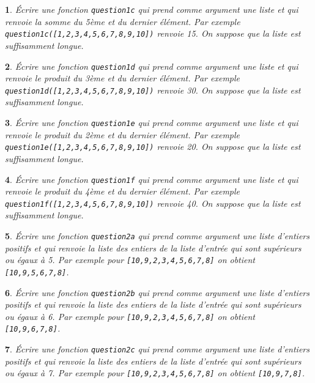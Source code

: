 \documentclass[10pt]{article}
\newtheorem{exi}{}
\newenvironment{exo}{\begin{exi}\em}{\end{exi}}
\begin{document}
\vspace*{-2ex}
\begin{exo}
    Écrire une fonction {\tt question1c} qui prend comme argument une liste et
qui renvoie la somme du 5ème et du dernier élément. Par exemple
\verb+question1c([1,2,3,4,5,6,7,8,9,10])+ renvoie 15.
On suppose que la liste est suffisamment longue.
\end{exo}
\vspace*{-2ex}
\begin{exo}
    Écrire une fonction {\tt question1d} qui prend comme argument une liste et
qui renvoie le produit du 3ème et du dernier élément. Par exemple
\verb+question1d([1,2,3,4,5,6,7,8,9,10])+ renvoie 30.
On suppose que la liste est suffisamment longue.
\end{exo}
\vspace*{-2ex}
\begin{exo}
    Écrire une fonction {\tt question1e} qui prend comme argument une liste et
qui renvoie le produit du 2ème et du dernier élément. Par exemple
\verb+question1e([1,2,3,4,5,6,7,8,9,10])+ renvoie 20.
On suppose que la liste est suffisamment longue.
\end{exo}
\vspace*{-2ex}
\begin{exo}
    Écrire une fonction {\tt question1f} qui prend comme argument une liste et
qui renvoie le produit du 4ème et du dernier élément. Par exemple
\verb+question1f([1,2,3,4,5,6,7,8,9,10])+ renvoie 40.
On suppose que la liste est suffisamment longue.
\end{exo}
\vspace*{-2ex}
\begin{exo}
    Écrire une fonction {\tt question2a} qui prend comme argument une liste d'entiers positifs et qui renvoie la liste des entiers de la liste d'entrée qui sont
supérieurs ou égaux à 5. Par exemple pour \verb+[10,9,2,3,4,5,6,7,8]+
on obtient \verb+[10,9,5,6,7,8]+.
\end{exo}
\vspace*{-2ex}
\begin{exo}
    Écrire une fonction {\tt question2b} qui prend comme argument une liste d'entiers positifs et qui renvoie la liste des entiers de la liste d'entrée qui sont
supérieurs ou égaux à 6. Par exemple pour \verb+[10,9,2,3,4,5,6,7,8]+
on obtient \verb+[10,9,6,7,8]+.
\end{exo}
\vspace*{-2ex}
\begin{exo}
    Écrire une fonction {\tt question2c} qui prend comme argument une liste d'entiers positifs et qui renvoie la liste des entiers de la liste d'entrée qui sont
supérieurs ou égaux à 7. Par exemple pour \verb+[10,9,2,3,4,5,6,7,8]+
on obtient \verb+[10,9,7,8]+.
\end{exo}
\end{document}
